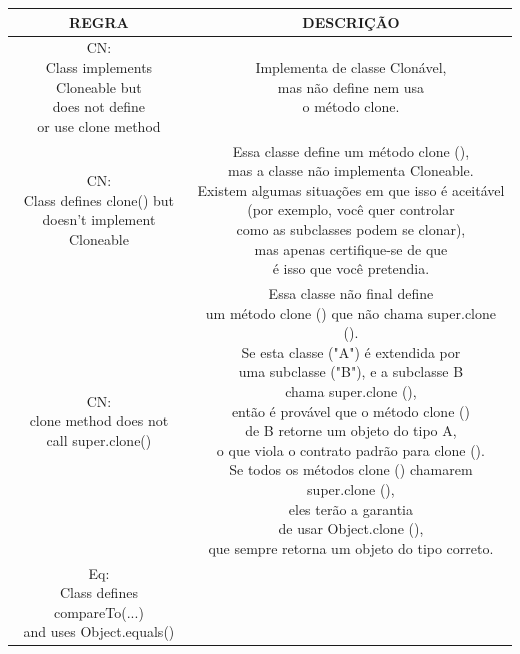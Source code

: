 \documentclass[12pt]{article}
\begin{document}
\begin{table}[h!]
 \begin{tabular}{| c | c |} 
 \hline
 REGRA & DESCRIÇÃO \\ [0.5ex]
  \hline\hline
  \hline \makecell{CN:\\ Class implements\\ Cloneable but\\ does not define\\ or use clone method } &
  \makecell{Implementa de classe Clonável,\\ mas não define nem usa\\ o método clone.} \\ 
  \hline \makecell{CN:\\ Class defines clone() but \\ doesn't implement Cloneable } &
  \makecell{Essa classe define um método clone (),\\ mas a classe não implementa Cloneable.\\ Existem algumas situações em que isso é aceitável\\ (por exemplo, você quer controlar\\ como as subclasses podem se clonar),\\ mas apenas certifique-se de que\\ é isso que você pretendia.} \\ 
  \hline \makecell{CN:\\ clone method does not \\ call super.clone() } &
  \makecell{Essa classe não final define\\ um método clone () que não chama super.clone ().\\ Se esta classe ("A") é extendida por\\ uma subclasse ("B"), e a subclasse B\\ chama super.clone (),\\ então é provável que o método clone ()\\ de B retorne um objeto do tipo A,\\ o que viola o contrato padrão para clone ().\\ Se todos os métodos clone () chamarem super.clone (),\\ eles terão a garantia\\ de usar Object.clone (),\\ que sempre retorna um objeto do tipo correto.} \\ 
  \hline \makecell{Eq:\\ Class defines compareTo(...) \\ and uses Object.equals() } &

\end{tabular}
\end{table}
\end{document}
